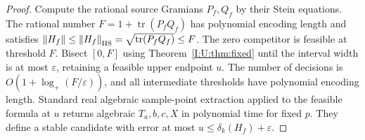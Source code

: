 \begin{proof}
Compute the rational source Gramians $P_f,Q_f$ by their Stein
equations.  The rational number
$F=1+\operatorname{tr}(P_fQ_f)$ has polynomial encoding length and
satisfies
$\left\lVert H_f\right\rVert\le\left\lVert H_f\right\rVert_{\mathrm{HS}}
=\sqrt{\operatorname{tr}(P_fQ_f)}\le F$.
The zero competitor is feasible at threshold $F$.
Bisect $[0,F]$ using Theorem~\ref{I:U:thm:fixed} until the interval width
is at most $\varepsilon$, retaining a feasible upper endpoint $u$.
The number of decisions is
$O(1+\log_+(F/\varepsilon))$, and all intermediate thresholds have
polynomial encoding length.
Standard real algebraic sample-point extraction
\cite{basu2006} applied to the feasible formula at $u$ returns
algebraic $T_a,b,c,X$ in polynomial time for fixed $p$.
They define a stable candidate with error at most
$u\le\delta_k(H_f)+\varepsilon$.
\end{proof}
